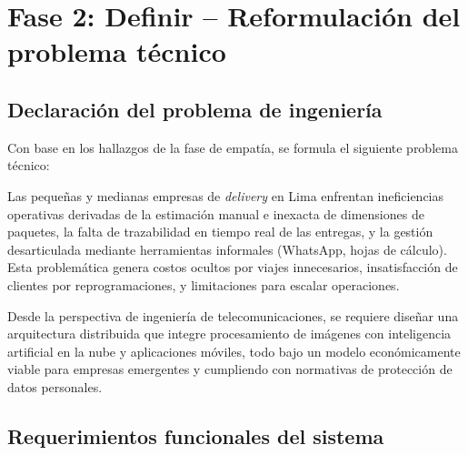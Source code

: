 \section{Fase 2: Definir – Reformulación del problema técnico}

\subsection{Declaración del problema de ingeniería}

Con base en los hallazgos de la fase de empatía, se formula el siguiente problema técnico:

Las pequeñas y medianas empresas de \textit{delivery} en Lima enfrentan ineficiencias operativas derivadas de la estimación manual e inexacta de dimensiones de paquetes, la falta de trazabilidad en tiempo real de las entregas, y la gestión desarticulada mediante herramientas informales (WhatsApp, hojas de cálculo). Esta problemática genera costos ocultos por viajes innecesarios, insatisfacción de clientes por reprogramaciones, y limitaciones para escalar operaciones.

Desde la perspectiva de ingeniería de telecomunicaciones, se requiere diseñar una arquitectura distribuida que integre procesamiento de imágenes con inteligencia artificial en la nube y aplicaciones móviles, todo bajo un modelo económicamente viable para empresas emergentes y cumpliendo con normativas de protección de datos personales.

\subsection{Requerimientos funcionales del sistema}



